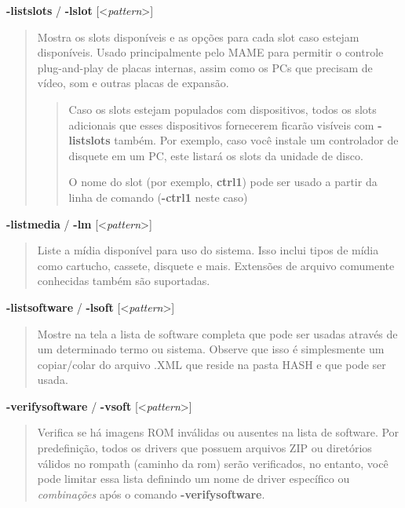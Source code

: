 \documentclass[letterpaper,10pt,brazil]{sphinxmanual}
\begin{document}
\label{commandline/commandline-all:mame-commandline-listslots}
\textbf{-listslots} / \textbf{-lslot} {[}\textless{}\emph{pattern}\textgreater{}{]}
\begin{quote}

Mostra os slots disponíveis e as opções para cada slot caso
estejam disponíveis. Usado principalmente pelo MAME para
permitir o controle plug-and-play de placas internas, assim
como os PCs que precisam de vídeo, som e outras placas de
expansão.
\begin{quote}

Caso os slots estejam populados com dispositivos, todos os slots
adicionais que esses dispositivos fornecerem ficarão visíveis
com \textbf{-listslots} também. Por exemplo, caso você instale um
controlador de disquete em um PC, este listará os slots da
unidade de disco.

O nome do slot (por exemplo, \textbf{ctrl1}) pode ser usado a partir
da linha de comando (\textbf{-ctrl1} neste caso)
\end{quote}
\end{quote}
\label{commandline/commandline-all:mame-commandline-listmedia}
\textbf{-listmedia} / \textbf{-lm} {[}\textless{}\emph{pattern}\textgreater{}{]}
\begin{quote}

Liste a mídia disponível para uso do sistema. Isso inclui tipos
de mídia como cartucho, cassete, disquete e mais. Extensões de
arquivo comumente conhecidas também são suportadas.
\end{quote}
\label{commandline/commandline-all:mame-commandline-listsoftware}
\textbf{-listsoftware} / \textbf{-lsoft} {[}\textless{}\emph{pattern}\textgreater{}{]}
\begin{quote}

Mostre na tela a lista de software completa que pode ser
usadas através de um determinado termo ou sistema. Observe que
isso é simplesmente um copiar/colar do arquivo .XML que reside
na pasta HASH e que pode ser usada.
\end{quote}
\label{commandline/commandline-all:mame-commandline-verifysoftware}
\textbf{-verifysoftware} / \textbf{-vsoft} {[}\textless{}\emph{pattern}\textgreater{}{]}
\begin{quote}

Verifica se há imagens ROM inválidas ou ausentes na lista de
software. Por predefinição, todos os drivers que possuem arquivos
ZIP ou diretórios válidos no rompath (caminho da rom) serão
verificados, no entanto, você pode limitar essa lista definindo um
nome de driver específico ou \emph{combinações} após o comando
\textbf{-verifysoftware}.
\end{quote}
\end{document}
